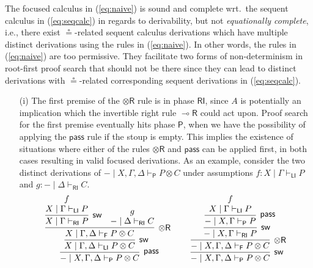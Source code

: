\documentclass[copyright,creativecommons]{eptcs}
\theoremstyle{definition}
\newcommand{\tr}{\otimes \mathsf{R}}
\newcommand{\lright}{{\multimap}\mathsf{R}}
\newcommand{\pass}{\mathsf{pass}}
\newcommand{\ot}{\otimes}
\newcommand{\RI}{\mathsf{RI}}
\newcommand{\LI}{\mathsf{LI}}
\newcommand{\Pass}{\mathsf{P}}
\newcommand{\F}{\mathsf{F}}
\newcommand{\proofbox}[1]{\begin{tabular}{l} #1 \end{tabular}}
\begin{document}
The focused calculus in (\ref{eq:naive}) is sound and complete wrt.\ the sequent calculus in (\ref{eq:seqcalc}) in regards to derivability, but not \emph{equationally complete}, i.e., there exist $\circeq$-related sequent calculus derivations which have multiple distinct derivations using the rules in (\ref{eq:naive}). In other words, the rules in (\ref{eq:naive}) are too permissive. They facilitate two forms of non-determinism in root-first proof search that should not be there since they can lead to distinct derivations with $\circeq$-related corresponding sequent derivations in (\ref{eq:seqcalc}).
\begin{enumerate}
\item[(i)] The first premise of the $\tr$ rule is in phase $\RI$, since $A$ is potentially an implication which the invertible right rule $\lright$ could act upon. Proof search for the first premise eventually hits phase $\Pass$, when we have the possibility of applying the $\pass$ rule if the stoup is empty. This implies the existence of situations where either of the rules $\tr$ and $\pass$ can be applied first, in both cases resulting in valid focused derivations.
  As an example, consider the two distinct derivations of ${-} \mid X , \Gamma , \Delta \vdash_{\Pass} P \ot C$ under assumptions $f : X \mid \Gamma \vdash_{\LI} P$ and $g : {-} \mid \Delta \vdash_{\RI} C$.
  \begin{equation}\label{eq:passtr}
    \proofbox{
      \infer[\pass]{{-} \mid X , \Gamma , \Delta \vdash_{\Pass} P \ot C}{
        \infer[\mathsf{sw}]{X \mid \Gamma , \Delta \vdash_{\LI} P \ot C}{
          \infer[\tr]{X \mid \Gamma , \Delta \vdash_{\F} P \ot C}{
            \infer[\mathsf{sw}]{X \mid \Gamma \vdash_{\RI} P}{
              \deduce{X \mid \Gamma \vdash_{\LI} P}{f}
            }
            &
            \deduce{{-} \mid \Delta \vdash_{\RI} C}{g}
          }
        }
      }
    \qquad
    \infer[\mathsf{sw}]{{-} \mid X , \Gamma , \Delta \vdash_{\Pass} P \ot C}{
      \infer[\tr]{{-} \mid X , \Gamma , \Delta \vdash_{\F} P \ot C}{
        \infer[\mathsf{sw}]{{-} \mid X , \Gamma \vdash_{\RI} P}{
          \infer[\pass]{{-} \mid X , \Gamma \vdash_{\Pass} P}{
            \deduce{X \mid \Gamma \vdash_{\LI} P}{f}
}}}}}
\end{equation}
\end{enumerate}
\end{document}
